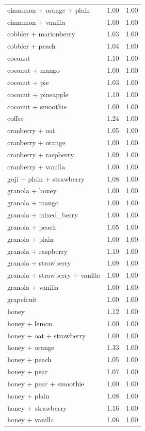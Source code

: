 \begin{table}
\begin{tabular}{lrr}
cinnamon + orange + plain & 1.00 & 1.00 \\
cinnamon + vanilla & 1.00 & 1.00 \\
cobbler + marionberry & 1.03 & 1.00 \\
cobbler + peach & 1.04 & 1.00 \\
coconut & 1.10 & 1.00 \\
coconut + mango & 1.00 & 1.00 \\
coconut + pie & 1.03 & 1.00 \\
coconut + pineapple & 1.10 & 1.00 \\
coconut + smoothie & 1.00 & 1.00 \\
coffee & 1.24 & 1.00 \\
cranberry + oat & 1.05 & 1.00 \\
cranberry + orange & 1.00 & 1.00 \\
cranberry + raspberry & 1.09 & 1.00 \\
cranberry + vanilla & 1.00 & 1.00 \\
goji + plain + strawberry & 1.08 & 1.00 \\
granola + honey & 1.00 & 1.00 \\
granola + mango & 1.00 & 1.00 \\
granola + mixed\_berry & 1.00 & 1.00 \\
granola + peach & 1.05 & 1.00 \\
granola + plain & 1.00 & 1.00 \\
granola + raspberry & 1.10 & 1.00 \\
granola + strawberry & 1.09 & 1.00 \\
granola + strawberry + vanilla & 1.00 & 1.00 \\
granola + vanilla & 1.00 & 1.00 \\
grapefruit & 1.00 & 1.00 \\
honey & 1.12 & 1.00 \\
honey + lemon & 1.00 & 1.00 \\
honey + oat + strawberry & 1.00 & 1.00 \\
honey + orange & 1.33 & 1.00 \\
honey + peach & 1.05 & 1.00 \\
honey + pear & 1.07 & 1.00 \\
honey + pear + smoothie & 1.00 & 1.00 \\
honey + plain & 1.08 & 1.00 \\
honey + strawberry & 1.16 & 1.00 \\
honey + vanilla & 1.06 & 1.00 \\

\end{tabular}
\end{table}

